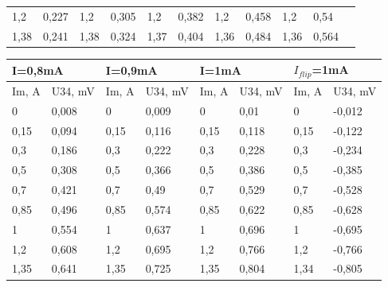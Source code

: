 \documentclass[a4paper,12pt]{article}
\begin{document}
\begin{table}[!ht]
\begin{tabular}{|ll|ll|ll|ll|ll|l}
\multicolumn{1}{|l|}{1,2}   & 0,227   & \multicolumn{1}{l|}{1,2}   & 0,305   & \multicolumn{1}{l|}{1,2}   & 0,382   & \multicolumn{1}{l|}{1,2}   & 0,458   & \multicolumn{1}{l|}{1,2}   & 0,54    &  \\ \cline{1-10}
\multicolumn{1}{|l|}{1,38}  & 0,241   & \multicolumn{1}{l|}{1,38}  & 0,324   & \multicolumn{1}{l|}{1,37}  & 0,404   & \multicolumn{1}{l|}{1,36}  & 0,484   & \multicolumn{1}{l|}{1,36}  & 0,564   &  \\ \cline{1-10}
\end{tabular}
\end{table}

\begin{table}[!ht]
\centering
\begin{tabular}{|ll|ll|ll|ll|}
\hline
\multicolumn{2}{|l|}{I=0,8mA}         & \multicolumn{2}{l|}{I=0,9mA}         & \multicolumn{2}{l|}{I=1mA}           & \multicolumn{2}{l|}{$I_{flip}$=1mA}           \\ \hline
\multicolumn{1}{|l|}{Im, A} & U34, mV & \multicolumn{1}{l|}{Im, A} & U34, mV & \multicolumn{1}{l|}{Im, A} & U34, mV & \multicolumn{1}{l|}{Im, A} & U34, mV \\ \hline
\multicolumn{1}{|l|}{0}     & 0,008   & \multicolumn{1}{l|}{0}     & 0,009   & \multicolumn{1}{l|}{0}     & 0,01    & \multicolumn{1}{l|}{0}     & -0,012  \\ \hline
\multicolumn{1}{|l|}{0,15}  & 0,094   & \multicolumn{1}{l|}{0,15}  & 0,116   & \multicolumn{1}{l|}{0,15}  & 0,118   & \multicolumn{1}{l|}{0,15}  & -0,122  \\ \hline
\multicolumn{1}{|l|}{0,3}   & 0,186   & \multicolumn{1}{l|}{0,3}   & 0,222   & \multicolumn{1}{l|}{0,3}   & 0,228   & \multicolumn{1}{l|}{0,3}   & -0,234  \\ \hline
\multicolumn{1}{|l|}{0,5}   & 0,308   & \multicolumn{1}{l|}{0,5}   & 0,366   & \multicolumn{1}{l|}{0,5}   & 0,386   & \multicolumn{1}{l|}{0,5}   & -0,385  \\ \hline
\multicolumn{1}{|l|}{0,7}   & 0,421   & \multicolumn{1}{l|}{0,7}   & 0,49    & \multicolumn{1}{l|}{0,7}   & 0,529   & \multicolumn{1}{l|}{0,7}   & -0,528  \\ \hline
\multicolumn{1}{|l|}{0,85}  & 0,496   & \multicolumn{1}{l|}{0,85}  & 0,574   & \multicolumn{1}{l|}{0,85}  & 0,622   & \multicolumn{1}{l|}{0,85}  & -0,628  \\ \hline
\multicolumn{1}{|l|}{1}     & 0,554   & \multicolumn{1}{l|}{1}     & 0,637   & \multicolumn{1}{l|}{1}     & 0,696   & \multicolumn{1}{l|}{1}     & -0,695  \\ \hline
\multicolumn{1}{|l|}{1,2}   & 0,608   & \multicolumn{1}{l|}{1,2}   & 0,695   & \multicolumn{1}{l|}{1,2}   & 0,766   & \multicolumn{1}{l|}{1,2}   & -0,766  \\ \hline
\multicolumn{1}{|l|}{1,35}  & 0,641   & \multicolumn{1}{l|}{1,35}  & 0,725   & \multicolumn{1}{l|}{1,35}  & 0,804   & \multicolumn{1}{l|}{1,34}  & -0,805  \\ \hline
\end{tabular}
\end{table}
\end{document}
